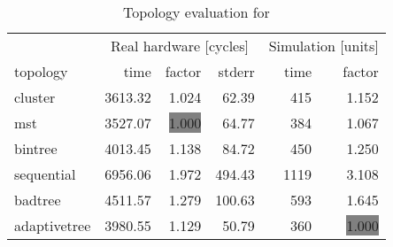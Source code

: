 \begin{table}[htb]
  \centering
  \begin{tabular}{lrrrrr}
  \toprule
  & \multicolumn{3}{c}{Real hardware [cycles]} & \multicolumn{2}{c}{Simulation [units]} \\
  topology & time & factor & stderr & time & factor \\
  \midrule
  cluster & 3613.32 & 1.024 & 62.39 & 415 & 1.152 \\
  mst & 3527.07 & \colorbox{gray}{1.000} & 64.77 & 384 & 1.067 \\
  bintree & 4013.45 & 1.138 & 84.72 & 450 & 1.250 \\
  sequential & 6956.06 & 1.972 & 494.43 & 1119 & 3.108 \\
  badtree & 4511.57 & 1.279 & 100.63 & 593 & 1.645 \\
  adaptivetree & 3980.55 & 1.129 & 50.79 & 360 & \colorbox{gray}{1.000} \\
  \midrule
  \end{tabular}
  \caption{Topology evaluation for \gruyere}
  \label{tab:gruyere}
\end{table}
